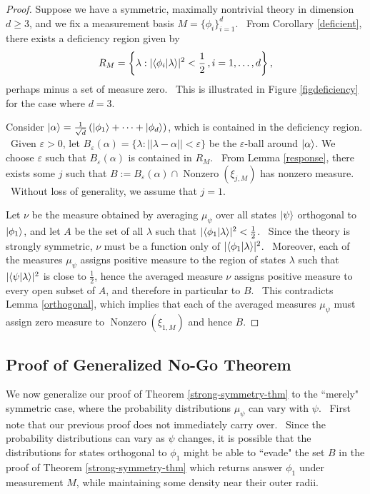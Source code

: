 \documentclass[letterpaper,12pt]{article}
\newcommand{\braket}[2]{\mbox{$ \langle #1 | #2 \rangle $}}
\newcommand{\ket}[1]{\mbox{$ | #1 \rangle $}}
\DeclareMathOperator{\nz}{Nonzero}
\begin{document}
\begin{proof}
Suppose we have a symmetric, maximally nontrivial theory in dimension $d\geq 3$, and we fix a measurement basis $M=\{\phi_i\}_{i=1}^d$. \ From Corollary \ref{deficient}, there exists a deficiency region given by
\[ R_M = \left\{\lambda:|\braket{\phi_i}{\lambda}|^2 <\frac{1}{2}\,, i=1,\ldots,d\right\}, \]
\noindent perhaps minus a set of measure zero. \ This is illustrated in Figure \ref{figdeficiency} for the case where $d=3$.

Consider $\ket{\alpha}=\frac{1}{\sqrt{d}}\left(\ket{\phi_1}+\cdots +\ket{\phi_d}\right)$, which is contained in the deficiency region. \
Given $\varepsilon >0$, let $B_\varepsilon (\alpha)=\{\lambda:||\lambda-\alpha||<\varepsilon\}$ be the $\varepsilon$-ball around $\ket{\alpha}$. We choose $\varepsilon$ such that $B_\varepsilon (\alpha)$ is contained in $R_M$. \ From Lemma \ref{response}, there exists some $j$ such that $B := B_\varepsilon(\alpha)\cap\nz(\xi_{j,M})$ has nonzero measure. \  Without loss of generality, we assume that $j=1$.

Let $\nu$ be the measure obtained by averaging $\mu_{\psi}$ over all states $\ket{\psi}$ orthogonal to $\ket{\phi_1}$, and let $A$ be the set of all $\lambda$ such that $|\braket{\phi_1}{\lambda}|^2<\frac{1}{2}$. \ Since the theory is strongly symmetric, $\nu$ must be a function only of $|\braket{\phi_1}{\lambda}|^2$. \ Moreover, each of the measures $\mu_{\psi}$ assigns positive measure to the region of states $\lambda$ such that $|\braket{\psi}{\lambda}|^2$ is close to $\frac{1}{2}$, hence the averaged measure $\nu$ assigns positive measure to every open subset of $A$, and therefore in particular to $B$. \ This contradicts Lemma \ref{orthogonal}, which implies that each of the averaged measures $\mu_{\psi}$ must assign zero measure to $\nz(\xi_{1,M})$ and hence $B$.
\end{proof}



\subsection{Proof of Generalized No-Go Theorem}

We now generalize our proof of Theorem \ref{strong-symmetry-thm} to the ``merely" symmetric case, where the probability distributions $\mu_\psi$ can vary with $\psi$. \ First note that our previous proof does not immediately carry over. \ Since the probability distributions can vary as $\psi$ changes, it is possible that the distributions for states orthogonal to $\phi_1$ might be able to ``evade" the set $B$ in the proof of Theorem \ref{strong-symmetry-thm} which returns answer $\phi_1$ under measurement $M$, while maintaining some density near their outer radii.
\end{document}
